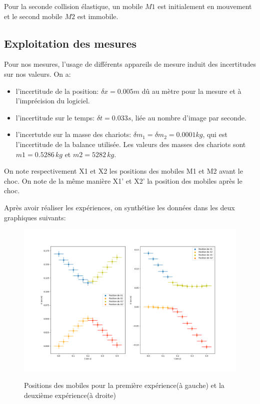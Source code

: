 \documentclass[12pt]{article}
\begin{document}
Pour la seconde collision élastique, un mobile $M1$ est initialement en mouvement et le second mobile $M2$ est immobile.



\subsection{Exploitation des mesures}
Pour nos mesures, l'usage de différents appareils de mesure induit des incertitudes sur nos valeurs. On a:
\begin{itemize}
    \item l'incertitude de la position: $\delta x = 0.005m$ dû au mètre pour la mesure et à l'imprécision du logiciel.
    \item l'incertitude sur le temps: $\delta t = 0.033s$, liée au nombre d'image par seconde. 
    \item l'incertutde sur la masse des chariots: $\delta m_1 =\delta m_2 = 0.0001 kg$, qui est l'incertitude de la balance utilisée. Les valeurs des masses des chariots sont $m1=0.5286\,kg$ et $m2=5282\, kg$.
\end{itemize}

On note respectivement X1 et X2 les positions des mobiles M1 et M2 avant le choc. On note de la même manière X1' et X2' la position des mobiles après le choc. 

\newpage
Après avoir réaliser les expériences, on synthétise les données dans les deux graphiques suivants:
\begin{figure}[h!]
	\begin{center}
		\includegraphics[scale=0.5]{GrapheX.png}
		\label{GrapheX1,...}
		 \caption{Positions des mobiles pour la première expérience(à gauche) et la deuxième expérience(à droite)}
	\end{center}
\end{figure}
\end{document}
